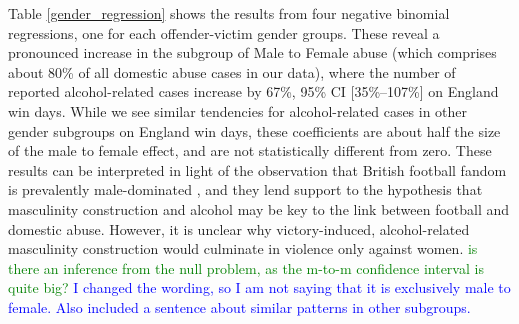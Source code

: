 \documentclass[12pt, letterpaper]{article}
\newcommand{\NS}[1] {{\textcolor{green}{#1}}}
\newcommand{\AT}[1] {{\textcolor{blue}{#1}}}
\begin{document}
Table \ref{gender_regression} shows the results from four negative binomial regressions, one for each offender-victim gender groups. These reveal a pronounced increase in the subgroup of Male to Female abuse (which comprises about 80\% of all domestic abuse cases in our data), where the number of reported alcohol-related cases increase by 67\%, 95\% CI [35\%--107\%] on England win days. While we see similar tendencies for alcohol-related cases in other gender subgroups on England win days, these coefficients are about half the size of the male to female effect, and are not statistically different from zero. These results can be interpreted in light of the observation that British football fandom is prevalently male-dominated \autocite{Parry2014}, and they lend support to the hypothesis that masculinity construction and alcohol may be key to the link between football and domestic abuse. However, it is unclear why victory-induced, alcohol-related masculinity construction would culminate in violence only against women. \NS{is there an inference from the null problem, as the m-to-m confidence interval is quite big? } \AT{I changed the wording, so I am not saying that it is exclusively male to female. Also included a sentence about similar patterns in other subgroups.}
\end{document}
